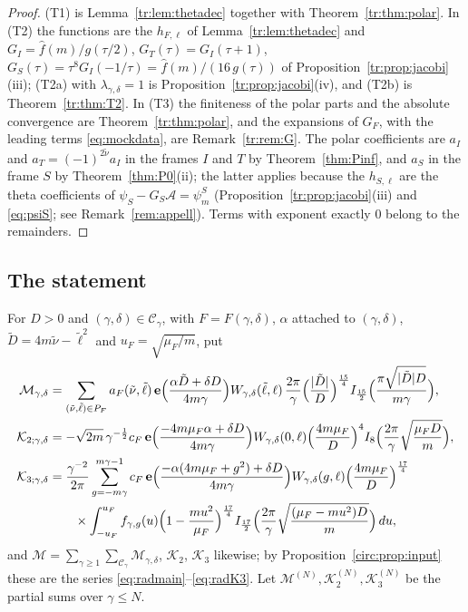 \begin{proof}
(T1) is Lemma~\ref{tr:lem:thetadec} together with Theorem~\ref{tr:thm:polar}. In (T2) the functions are the $h_{F,\ell}$ of Lemma~\ref{tr:lem:thetadec} and $G_I=\hat f(m)/g(\tau/2)$, $G_T(\tau)=G_I(\tau+1)$, $G_S(\tau)=\tau^8G_I(-1/\tau)=\hat f(m)/(16\,g(\tau))$ of Proposition~\ref{tr:prop:jacobi}(iii); (T2a) with $\lambda_{\gamma,\delta}=1$ is Proposition~\ref{tr:prop:jacobi}(iv), and (T2b) is Theorem~\ref{tr:thm:T2}. In (T3) the finiteness of the polar parts and the absolute convergence are Theorem~\ref{tr:thm:polar}, and the expansions of $G_F$, with the leading terms \eqref{eq:mockdata}, are Remark~\ref{tr:rem:G}. The polar coefficients are $a_I$ and $a_T=(-1)^{2\tilde\nu}a_I$ in the frames $I$ and $T$ by Theorem~\ref{thm:Pinf}, and $a_S$ in the frame $S$ by Theorem~\ref{thm:P0}(ii); the latter applies because the $h_{S,\ell}$ are the theta coefficients of $\psi_S-G_S\mathcal A=\psi^S_m$ (Proposition~\ref{tr:prop:jacobi}(iii) and \eqref{eq:psiS}; see Remark~\ref{rem:appell}). Terms with exponent exactly $0$ belong to the remainders.
\end{proof}

\subsection{The statement}
For $D>0$ and $(\gamma,\delta)\in\mathcal C_\gamma$, with $F=F(\gamma,\delta)$, $\alpha$ attached to $(\gamma,\delta)$, $\tilde D=4m\tilde\nu-\tilde\ell^2$ and $u_F=\sqrt{\mu_F/m}$, put
\begin{align}
\mathcal M_{\gamma,\delta}&=\sum_{(\tilde\nu,\tilde\ell)\in P_F}a_F(\tilde\nu,\tilde\ell)\,\mathbf e\Big(\frac{\alpha\tilde D+\delta D}{4m\gamma}\Big)W_{\gamma,\delta}(\tilde\ell,\ell)\,\frac{2\pi}\gamma\Big(\frac{|\tilde D|}{D}\Big)^{\frac{15}4}I_{\frac{15}2}\Big(\frac{\pi\sqrt{|\tilde D|D}}{m\gamma}\Big),\label{circ:Mterm}\\
\mathcal K_{2;\gamma,\delta}&=-\sqrt{2m}\,\gamma^{-\frac12}c_F\,\mathbf e\Big(\frac{-4m\mu_F\alpha+\delta D}{4m\gamma}\Big)W_{\gamma,\delta}(0,\ell)\Big(\frac{4m\mu_F}{D}\Big)^4I_8\Big(\frac{2\pi}\gamma\sqrt{\frac{\mu_FD}m}\Big),\label{circ:K2term}\\
\mathcal K_{3;\gamma,\delta}&=\frac{\gamma^{-2}}{2\pi}\sum_{g=-m\gamma}^{m\gamma-1}c_F\,\mathbf e\Big(\frac{-\alpha(4m\mu_F+g^2)+\delta D}{4m\gamma}\Big)W_{\gamma,\delta}(g,\ell)\Big(\frac{4m\mu_F}{D}\Big)^{\frac{17}4}\label{circ:K3term}\\
&\qquad\times\int_{-u_F}^{u_F}f_{\gamma,g}(u)\Big(1-\frac{mu^2}{\mu_F}\Big)^{\frac{17}4}I_{\frac{17}2}\Big(\frac{2\pi}\gamma\sqrt{\frac{(\mu_F-mu^2)D}m}\Big)\,du,\notag
\end{align}
and $\mathcal M=\sum_{\gamma\ge1}\sum_{\mathcal C_\gamma}\mathcal M_{\gamma,\delta}$, $\mathcal K_2$, $\mathcal K_3$ likewise; by Proposition~\ref{circ:prop:input} these are the series \eqref{eq:radmain}--\eqref{eq:radK3}. Let $\mathcal M^{(N)},\mathcal K_2^{(N)},\mathcal K_3^{(N)}$ be the partial sums over $\gamma\le N$.

